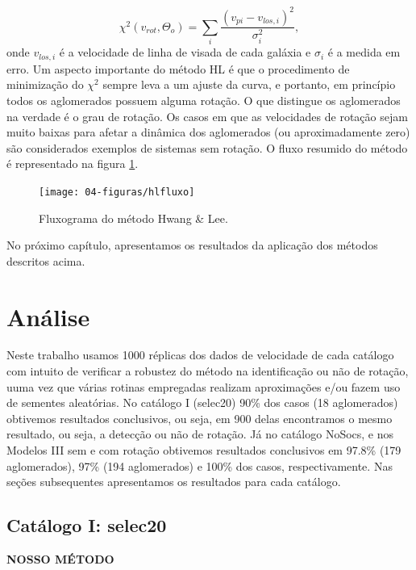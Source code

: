 \begin{equation}
 \chi^2 (v_{rot}, \Theta_o) = \sum_i{\frac{(v_{pi} - v_{los, i})^2}{\sigma^{2}_{i}}} ,
 \label{hwanglee2}
\end{equation}
onde $v_{los, i}$ é a velocidade de linha de visada de cada galáxia e $\sigma_i$ é a medida em erro.
Um aspecto importante do método HL é que o procedimento de minimização do $\chi^2$ sempre leva a um ajuste da curva, e 
portanto, em princípio todos os aglomerados possuem alguma rotação. O que distingue os aglomerados na verdade
é o grau de rotação. Os casos em que as velocidades de rotação sejam muito baixas para afetar a dinâmica dos aglomerados (ou aproximadamente zero)
são considerados exemplos de sistemas sem rotação. O fluxo resumido do método é representado na figura \ref{hlfluxo}.  

\begin{figure}[H] %
\vspace{-2pt}
\begin{center}
\texttt{[image: 04-figuras/hlfluxo]}%
\caption{Fluxograma do método Hwang \& Lee.}
\label{hlfluxo}%
\end{center}
\end{figure}

No próximo capítulo, apresentamos os resultados da aplicação dos métodos descritos acima.

\chapter{Análise}

Neste trabalho usamos 1000 réplicas dos dados de velocidade de cada catálogo com intuito de verificar a robustez do método na identificação ou não de rotação,
uuma vez que várias rotinas empregadas realizam aproximações e/ou fazem uso de sementes aleatórias. No catálogo I (selec20) 90\% dos casos (18 aglomerados) obtivemos resultados conclusivos, ou seja, em 900 delas encontramos o mesmo resultado, ou seja, a detecção ou não de rotação. Já no catálogo NoSocs, e nos Modelos III sem e com rotação obtivemos resultados conclusivos em 97.8\% (179 aglomerados), 97\% (194 aglomerados) e 100\% dos casos, respectivamente. Nas seções subsequentes apresentamos os resultados para cada catálogo.     

\section{Catálogo I: selec20}
\textbf{NOSSO MÉTODO}


